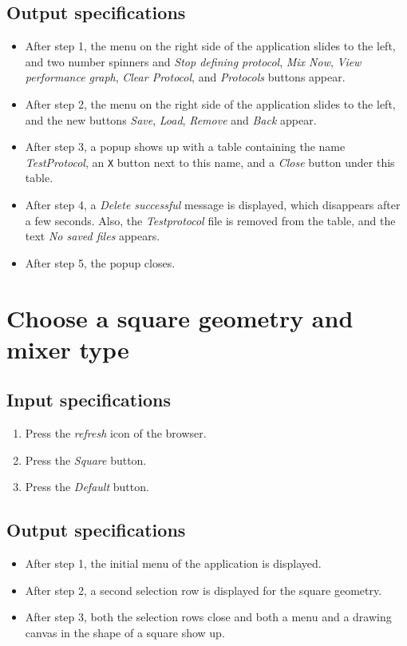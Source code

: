 \subsection*{Output specifications}
\begin{itemize}
\item After step 1, the menu on the right side of the application slides to the left, and two number spinners and \emph{Stop defining protocol}, \emph{Mix Now}, \emph{View performance graph}, \emph{Clear Protocol}, and \emph{Protocols} buttons appear.
\item After step 2, the menu on the right side of the application slides to the left, and the new buttons \emph{Save}, \emph{Load}, \emph{Remove} and \emph{Back} appear.
\item After step 3, a popup shows up with a table containing the name \emph{TestProtocol}, an \texttt{X} button next to this name, and a \emph{Close} button under this table.
\item After step 4, a \emph{Delete successful} message is displayed, which disappears after a few seconds. Also, the \emph{Testprotocol} file is removed from the table, and the text \emph{No saved files} appears.
\item After step 5, the popup closes.
\end{itemize}

\section{Choose a square geometry and mixer type}

\subsection*{Input specifications}
\begin{enumerate}
\item Press the \emph{refresh} icon of the browser.
\item Press the \emph{Square} button.
\item Press the \emph{Default} button.
\end{enumerate}

\subsection*{Output specifications}
\begin{itemize}
\item After step 1, the initial menu of the application is displayed.
\item After step 2, a second selection row is displayed for the square geometry.
\item After step 3, both the selection rows close and both a menu and a drawing canvas in the shape of a square show up.
\end{itemize}

